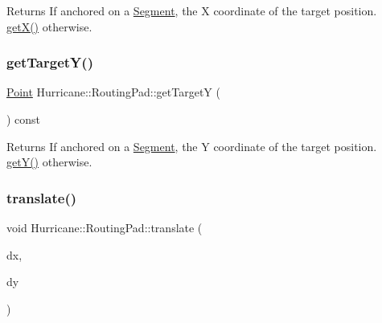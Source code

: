 \begin{DoxyReturn}{Returns}
If anchored on a \mbox{\hyperlink{classHurricane_1_1Segment}{Segment}}, the X coordinate of the target position. \mbox{\hyperlink{classHurricane_1_1RoutingPad_a5c9c00c648bd0d24e1a8b0876ab442df}{get\+X()}} otherwise. 
\end{DoxyReturn}
\mbox{\label{classHurricane_1_1RoutingPad_a41a9c831d668377fc0c5e628f66465a0}} 
\subsubsection{\texorpdfstring{get\+Target\+Y()}{getTargetY()}}
{\footnotesize\ttfamily \mbox{\hyperlink{classHurricane_1_1Point}{Point}} Hurricane\+::\+Routing\+Pad\+::get\+TargetY (\begin{DoxyParamCaption}{ }\end{DoxyParamCaption}) const}

\begin{DoxyReturn}{Returns}
If anchored on a \mbox{\hyperlink{classHurricane_1_1Segment}{Segment}}, the Y coordinate of the target position. \mbox{\hyperlink{classHurricane_1_1RoutingPad_aede4c04a7f893b1e5478b164b6eaae2d}{get\+Y()}} otherwise. 
\end{DoxyReturn}
\mbox{\label{classHurricane_1_1RoutingPad_a41bf66ffda0c0ceaaebc67acd72d5b36}} 
\subsubsection{\texorpdfstring{translate()}{translate()}}
{\footnotesize\ttfamily void Hurricane\+::\+Routing\+Pad\+::translate (\begin{DoxyParamCaption}\item[{const \mbox{\hyperlink{group__DbUGroup_ga4fbfa3e8c89347af76c9628ea06c4146}{Db\+U\+::\+Unit}} \&}]{dx,  }\item[{const \mbox{\hyperlink{group__DbUGroup_ga4fbfa3e8c89347af76c9628ea06c4146}{Db\+U\+::\+Unit}} \&}]{dy }\end{DoxyParamCaption})\hspace{0.3cm}{\ttfamily [virtual]}}

